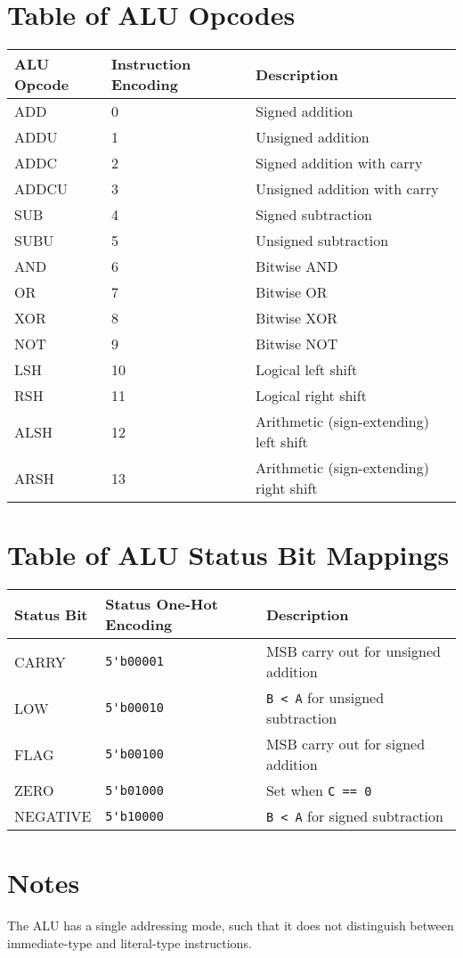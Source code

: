 \documentclass[conference]{IEEEtran}
\begin{document}
\section{Table of ALU Opcodes}
\begin{center}
\begin{tabular}{ | P{5em} | P{5em} | P{12em} | }
\hline
\textbf{ALU Opcode} & \textbf{Instruction Encoding} & \textbf{Description} \\
\hline
ADD & 0 & Signed addition \\
\hline
ADDU & 1 & Unsigned addition \\
\hline
ADDC & 2 & Signed addition with carry \\
\hline
ADDCU & 3 & Unsigned addition with carry \\
\hline
SUB & 4 & Signed subtraction \\
\hline
SUBU & 5 & Unsigned subtraction \\
\hline
AND & 6 & Bitwise AND \\
\hline
OR & 7 & Bitwise OR \\
\hline
XOR & 8 & Bitwise XOR \\
\hline
NOT & 9 & Bitwise NOT \\
\hline
LSH & 10 & Logical left shift \\
\hline
RSH & 11 & Logical right shift \\
\hline
ALSH & 12 & Arithmetic (sign-extending) left shift \\
\hline
ARSH & 13 & Arithmetic (sign-extending) right shift \\
\hline
\end{tabular}
\end{center}

\vspace{0.2in}
\section{Table of ALU Status Bit Mappings}
\begin{center}
\begin{tabular}{ | P{5em} | P{5em} | P{12em} | }
\hline
\textbf{Status Bit} & \textbf{Status One-Hot Encoding} & \textbf{Description} \\
\hline
CARRY & \verb|5'b00001| & MSB carry out for unsigned addition \\
\hline
LOW & \verb|5'b00010| & \verb|B < A| for unsigned subtraction \\
\hline
FLAG & \verb|5'b00100| & MSB carry out for signed addition \\
\hline
ZERO & \verb|5'b01000| & Set when \verb|C == 0| \\
\hline
NEGATIVE & \verb|5'b10000| & \verb|B < A| for signed subtraction \\
\hline
\end{tabular}
\end{center}

\section{Notes}
The ALU has a single addressing mode, such that it does not distinguish
between immediate-type and literal-type instructions.
\end{document}
